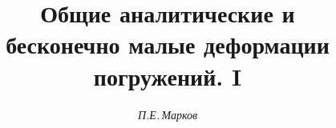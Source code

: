 




 




\newcommand{\const}{\operatorname{const}}


\newcommand{\bsy}{\boldsymbol}


\newcommand{\tts}[1]{}


 




 


\setcounter{page}{21} 












\author{\it П.Е.\,Марков} 


\title{Общие аналитические и\\


бесконечно малые деформации погружений. I} 


 


\date{} 




\pagestyle{plain} %


 




\maketitle 


